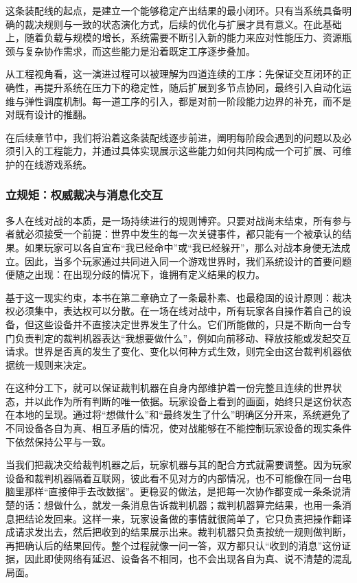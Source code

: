 这条装配线的起点，是建立一个能够稳定产出结果的最小闭环。只有当系统具备明确的裁决规则与一致的状态演化方式，后续的优化与扩展才具有意义。在此基础上，随着负载与规模的增长，系统需要不断引入新的能力来应对性能压力、资源瓶颈与复杂协作需求，而这些能力是沿着既定工序逐步叠加。

从工程视角看，这一演进过程可以被理解为四道连续的工序：先保证交互闭环的正确性，再提升系统在压力下的稳定性，随后扩展到多节点协同，最终引入自动化运维与弹性调度机制。每一道工序的引入，都是对前一阶段能力边界的补充，而不是对既有设计的推翻。

在后续章节中，我们将沿着这条装配线逐步前进，阐明每阶段会遇到的问题以及必须引入的工程能力，并通过具体实现展示这些能力如何共同构成一个可扩展、可维护的在线游戏系统。

\subsubsection{立规矩：权威裁决与消息化交互}\label{sec:权威裁决与消息化交}
多人在线对战的本质，是一场持续进行的规则博弈。只要对战尚未结束，所有参与者就必须接受一个前提：世界中发生的每一次关键事件，都只能有一个被承认的结果。如果玩家可以各自宣布“我已经命中”或“我已经躲开”，那么对战本身便无法成立。因此，当多个玩家通过共同进入同一个游戏世界时，我们系统设计的首要问题便随之出现：在出现分歧的情况下，谁拥有定义结果的权力。

基于这一现实约束，本书在第二章确立了一条最朴素、也最稳固的设计原则：裁决权必须集中，表达权可以分散。在一场在线对战中，所有玩家各自操作着自己的设备，但这些设备并不直接决定世界发生了什么。它们所能做的，只是不断向一台专门负责判定的裁判机器表达“我想要做什么”，例如向前移动、释放技能或发起交互请求。世界是否真的发生了变化、变化以何种方式生效，则完全由这台裁判机器依据统一规则来决定。

在这种分工下，就可以保证裁判机器在自身内部维护着一份完整且连续的世界状态，并以此作为所有判断的唯一依据。玩家设备上看到的画面，始终只是这份状态在本地的呈现。通过将“想做什么”和“最终发生了什么”明确区分开来，系统避免了不同设备各自为真、相互矛盾的情况，使对战能够在不能控制玩家设备的现实条件下依然保持公平与一致。

当我们把裁决交给裁判机器之后，玩家机器与其的配合方式就需要调整。因为玩家设备和裁判机器隔着互联网，彼此看不见对方的内部情况，也不可能像在同一台电脑里那样“直接伸手去改数据”。更稳妥的做法，是把每一次协作都变成一条条说清楚的话：想做什么，就发一条消息告诉裁判机器；裁判机器算完结果，也用一条消息把结论发回来。这样一来，玩家设备做的事情就很简单了，它只负责把操作翻译成请求发出去，然后把收到的结果展示出来。裁判机器只负责按统一规则做判断，再把确认后的结果回传。整个过程就像一问一答，双方都只认“收到的消息”这份证据，因此即使网络有延迟、设备各不相同，也不会出现各自为真、说不清楚的混乱局面。

